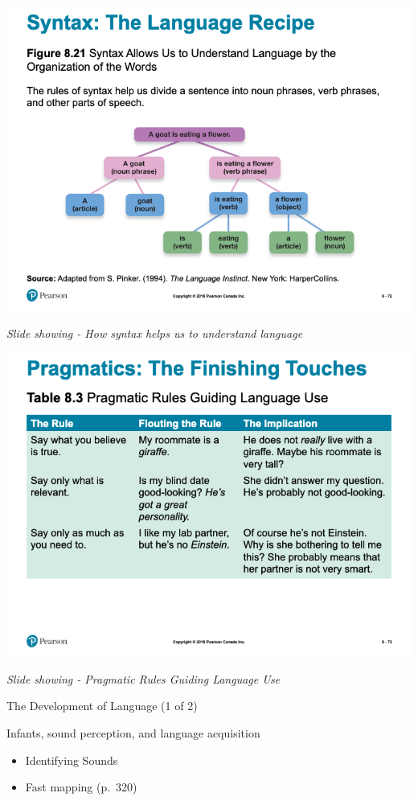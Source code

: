\documentclass[
]{book}
\providecommand{\tightlist}{%
  \setlength{\itemsep}{0pt}\setlength{\parskip}{0pt}}
\begin{document}
\includegraphics{assets/unit_1/slide_72.png}

\emph{Slide showing - How syntax helps us to understand language}

\includegraphics{assets/unit_1/slide_73.png}

\emph{Slide showing - Pragmatic Rules Guiding Language Use}

The Development of Language (1 of 2)

Infants, sound perception, and language acquisition

\begin{itemize}
\tightlist
\item
  Identifying Sounds\\
\item
  Fast mapping (p.~320)
\end{itemize}
\end{document}
